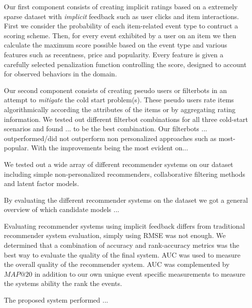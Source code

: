 Our first component consists of creating implicit ratings based on a extremely
sparse dataset with \textit{implicit} feedback such as user clicks and item
interactions. First we consider the probability of each item-related event type
to contruct a scoring scheme. Then, for every event exhibited by a user on an
item we then calculate the maximum score possible based on the event type and
various features such as recentness, price and popularity. Every feature is
given a carefully selected penalization function controlling the score,
designed to account for observed behaviors in the domain.

Our second component consists of creating pseudo users or filterbots in an
attempt to \textit{mitigate} the cold start problem(s). These pseudo users rate items algorithmically
according the attributes of the items or by aggregating rating information. We tested
out different filterbot combinations for all three cold-start scenarios and found ...
to be the best combination. Our filterbots ... outperformed/did not outperform non
personalized approaches such as most-popular. With the improvements being the most evident on...

We tested out a wide array of different recommender systems on our dataset including
simple non-personalized recommenders, collaborative filtering methods and latent factor models.

By evaluating the different recommender systems on the dataset we got a general overview of which
candidate models ... 



Evaluating recommender systems using implicit feedback differs from
traditional recommender system evaluation, simply using RMSE was not enough.
We determined that a combination of accuracy and rank-accuracy metrics was the
best way to evaluate the quality of the final system. AUC was used to measure
the overall quality of the recommender system. AUC was complemented by $MAP@20$
in addition to our own unique event specific measurements to measure the systems
ability the rank the events.


The proposed system performed ...

